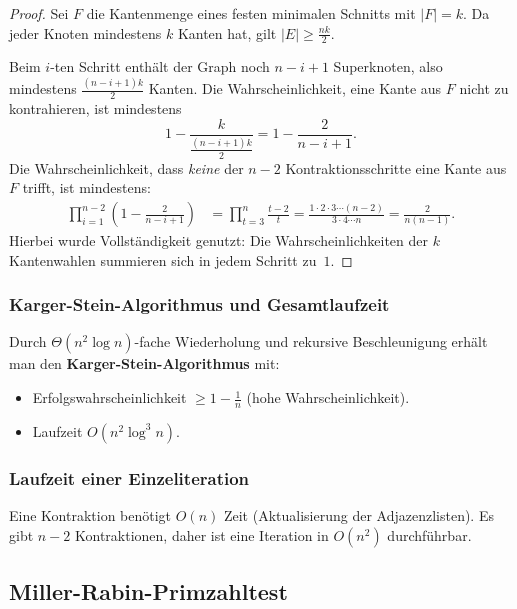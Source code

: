 ﻿\documentclass[12pt,a4paper]{article}
\theoremstyle{definition}
\theoremstyle{plain}
\theoremstyle{remark}
\begin{document}
\begin{proof}
  Sei $F$ die Kantenmenge eines festen minimalen Schnitts mit $|F| = k$.
  Da jeder Knoten mindestens $k$ Kanten hat, gilt $|E| \geq \frac{nk}{2}$.

  Beim $i$-ten Schritt enthält der Graph noch $n-i+1$ Superknoten, also
  mindestens $\frac{(n-i+1)k}{2}$ Kanten. Die Wahrscheinlichkeit, eine Kante
  aus $F$ nicht zu kontrahieren, ist mindestens
  \[
    1 - \frac{k}{\frac{(n-i+1)k}{2}} = 1 - \frac{2}{n-i+1}.
  \]
  Die Wahrscheinlichkeit, dass \emph{keine} der $n-2$ Kontraktionsschritte
  eine Kante aus $F$ trifft, ist mindestens:
  \begin{align*}
    \prod_{i=1}^{n-2}\!\left(1 - \frac{2}{n-i+1}\right)
    &= \prod_{t=3}^{n} \frac{t-2}{t}
    = \frac{1 \cdot 2 \cdot 3 \cdots (n-2)}{3 \cdot 4 \cdots n}
    = \frac{2}{n(n-1)}.
  \end{align*}
  Hierbei wurde Vollständigkeit genutzt: Die Wahrscheinlichkeiten der $k$
  Kantenwahlen summieren sich in jedem Schritt zu~$1$.
\end{proof}

\subsubsection{Karger-Stein-Algorithmus und Gesamtlaufzeit}

Durch $\Theta(n^2 \log n)$-fache Wiederholung und rekursive Beschleunigung
\cite{karger1996new} erhält man den \textbf{Karger-Stein-Algorithmus} mit:
\begin{itemize}
  \item Erfolgswahrscheinlichkeit $\geq 1 - \frac{1}{n}$ (hohe Wahrscheinlichkeit).
  \item Laufzeit $O(n^2 \log^3 n)$.
\end{itemize}

\subsubsection{Laufzeit einer Einzeliteration}

Eine Kontraktion benötigt $O(n)$ Zeit (Aktualisierung der Adjazenzlisten).
Es gibt $n-2$ Kontraktionen, daher ist eine Iteration in $O(n^2)$ durchführbar.

\subsection{Miller-Rabin-Primzahltest}
\label{subsec:miller}
\end{document}
